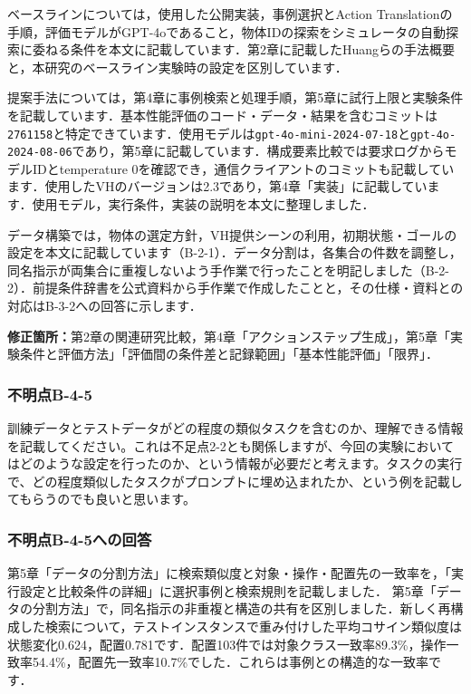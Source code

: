 \documentclass{jsarticle}
\begin{document}
ベースラインについては，使用した公開実装，事例選択とAction Translationの手順，評価モデルがGPT-4oであること，物体IDの探索をシミュレータの自動探索に委ねる条件を本文に記載しています．第2章に記載したHuangらの手法概要と，本研究のベースライン実験時の設定を区別しています．

提案手法については，第4章に事例検索と処理手順，第5章に試行上限と実験条件を記載しています．基本性能評価のコード・データ・結果を含むコミットは\texttt{2761158}と特定できています．使用モデルは\texttt{gpt-4o-mini-2024-07-18}と\texttt{gpt-4o-2024-08-06}であり，第5章に記載しています．構成要素比較では要求ログからモデルIDとtemperature 0を確認でき，通信クライアントのコミットも記載しています．使用したVHのバージョンは2.3であり，第4章「実装」に記載しています．使用モデル，実行条件，実装の説明を本文に整理しました．

データ構築では，物体の選定方針，VH提供シーンの利用，初期状態・ゴールの設定を本文に記載しています（B-2-1）．データ分割は，各集合の件数を調整し，同名指示が両集合に重複しないよう手作業で行ったことを明記しました（B-2-2）．前提条件辞書を公式資料から手作業で作成したことと，その仕様・資料との対応はB-3-2への回答に示します．

\noindent\textbf{修正箇所：}第2章の関連研究比較，第4章「アクションステップ生成」，第5章「実験条件と評価方法」「評価間の条件差と記録範囲」「基本性能評価」「限界」．


\subsubsection*{不明点B-4-5}
\begin{screen}
訓練データとテストデータがどの程度の類似タスクを含むのか、理解できる情報を記載してください。これは不足点2-2とも関係しますが、今回の実験においてはどのような設定を行ったのか、という情報が必要だと考えます。タスクの実行で、どの程度類似したタスクがプロンプトに埋め込まれたか、という例を記載してもらうのでも良いと思います。
\end{screen}
\subsubsection*{不明点B-4-5への回答}
第5章「データの分割方法」に検索類似度と対象・操作・配置先の一致率を，「実行設定と比較条件の詳細」に選択事例と検索規則を記載しました．
第5章「データの分割方法」で，同名指示の非重複と構造の共有を区別しました．新しく再構成した検索について，テストインスタンスで重み付けした平均コサイン類似度は状態変化0.624，配置0.781です．配置103件では対象クラス一致率89.3\%，操作一致率54.4\%，配置先一致率10.7\%でした．これらは事例との構造的な一致率です．
\end{document}
